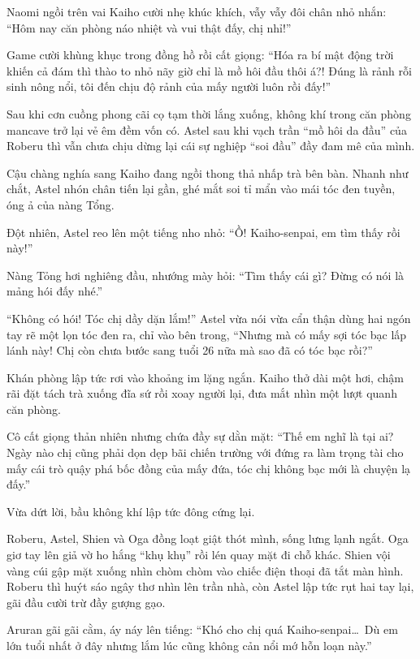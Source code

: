 \documentclass[../main.tex]{subfiles}
\begin{document}
Naomi ngồi trên vai Kaiho cười nhẹ khúc khích, vẫy vẫy đôi chân nhỏ nhắn: ``Hôm nay căn phòng náo nhiệt và vui thật đấy, chị nhỉ!''

Game cười khùng khục trong đồng hồ rồi cất giọng: ``Hóa ra bí mật động trời khiến cả đám thì thào to nhỏ nãy giờ chỉ là mồ hôi đầu thôi á?! Đúng là rảnh rỗi sinh nông nổi, tôi đến chịu độ rảnh của mấy người luôn rồi đấy!''

\omk

Sau khi cơn cuồng phong cãi cọ tạm thời lắng xuống, không khí trong căn phòng mancave trở lại vẻ êm đềm vốn có. Astel sau khi vạch trần ``mồ hôi da đầu'' của Roberu thì vẫn chưa chịu dừng lại cái sự nghiệp ``soi đầu'' đầy đam mê của mình.

Cậu chàng nghía sang Kaiho đang ngồi thong thả nhấp trà bên bàn. Nhanh như chắt, Astel nhón chân tiến lại gần, ghé mắt soi tỉ mẩn vào mái tóc đen tuyền, óng ả của nàng Tổng.

Đột nhiên, Astel reo lên một tiếng nho nhỏ: ``Ồ! Kaiho-senpai, em tìm thấy rồi này!''

Nàng Tỏng hơi nghiêng đầu, nhướng mày hỏi: ``Tìm thấy cái gì? Đừng có nói là mảng hói đấy nhé.''

``Không có hói! Tóc chị dầy dặn lắm!'' Astel vừa nói vừa cẩn thận dùng hai ngón tay rẽ một lọn tóc đen ra, chỉ vào bên trong, ``Nhưng mà có mấy sợi tóc bạc lấp lánh này! Chị còn chưa bước sang tuổi 26 nữa mà sao đã có tóc bạc rồi?''

Khán phòng lập tức rơi vào khoảng im lặng ngắn. Kaiho thở dài một hơi, chậm rãi đặt tách trà xuống đĩa sứ rồi xoay người lại, đưa mắt nhìn một lượt quanh căn phòng.

Cô cất giọng thản nhiên nhưng chứa đầy sự dằn mặt: ``Thế em nghĩ là tại ai? Ngày nào chị cũng phải dọn dẹp bãi chiến trường với đứng ra làm trọng tài cho mấy cái trò quậy phá bốc đồng của mấy đứa, tóc chị không bạc mới là chuyện lạ đấy.''

Vừa dứt lời, bầu không khí lập tức đông cứng lại.

Roberu, Astel, Shien và Oga đồng loạt giật thót mình, sống lưng lạnh ngắt. Oga giơ tay lên giả vờ ho hắng ``khụ khụ'' rồi lén quay mặt đi chỗ khác. Shien vội vàng cúi gập mặt xuống nhìn chòm chòm vào chiếc điện thoại đã tắt màn hình. Roberu thì huýt sáo ngây thơ nhìn lên trần nhà, còn Astel lập tức rụt hai tay lại, gãi đầu cười trừ đầy gượng gạo.

Aruran gãi gãi cằm, áy náy lên tiếng: ``Khó cho chị quá Kaiho-senpai\dots\ Dù em lớn tuổi nhất ở đây nhưng lắm lúc cũng không cản nổi mớ hỗn loạn này.''
\end{document}

